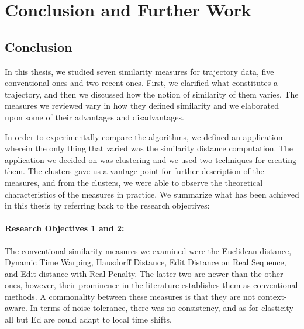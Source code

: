 \chapter{Conclusion and Further Work}
\label{ch:8}

\section{Conclusion}


In this thesis, we studied seven similarity measures for trajectory data, five conventional ones and two recent ones. 
First, we clarified what constitutes a trajectory, and then we discussed how the notion of similarity of them varies.
The measures we reviewed vary in how they defined similarity and we elaborated upon some of their advantages and disadvantages. 

In order to experimentally compare the algorithms, we defined an application wherein the only thing that varied was the similarity distance computation. 
The application we decided on was clustering and we used two techniques for creating them.
The clusters gave us a vantage point for further description of the measures, and from the clusters, we were able to observe the theoretical characteristics of the measures in practice. 
We summarize what has been achieved in this thesis by referring back to the research objectives:



\subsubsection*{Research Objectives 1 and 2:} 
The conventional similarity measures we examined were the Euclidean distance, Dynamic Time Warping, Hausdorff Distance, Edit Distance on Real Sequence, and Edit distance with Real Penalty. 
The latter two are newer than the other ones, however, their prominence in the literature establishes them as conventional methods. 
A commonality between these measures is that they are not context-aware. 
In terms of noise tolerance, there was no consistency, and as for elasticity all but Ed are could adapt to local time shifts. 

